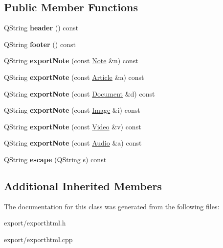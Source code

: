 \subsection*{Public Member Functions}
\begin{DoxyCompactItemize}
\item 
\hypertarget{class_export_h_t_m_l_af378e8ae98f67529f39f46cca79a5fef}{Q\-String {\bfseries header} () const }\label{class_export_h_t_m_l_af378e8ae98f67529f39f46cca79a5fef}

\item 
\hypertarget{class_export_h_t_m_l_a0d43c1eb88206e4619f6a1ebda4898cb}{Q\-String {\bfseries footer} () const }\label{class_export_h_t_m_l_a0d43c1eb88206e4619f6a1ebda4898cb}

\item 
\hypertarget{class_export_h_t_m_l_ad0f6f266f32dd6d3d17832933b7a697e}{Q\-String {\bfseries export\-Note} (const \hyperlink{class_note}{Note} \&n) const }\label{class_export_h_t_m_l_ad0f6f266f32dd6d3d17832933b7a697e}

\item 
\hypertarget{class_export_h_t_m_l_a1b04a2b0efc3b0a5a3e8030382c14f53}{Q\-String {\bfseries export\-Note} (const \hyperlink{class_article}{Article} \&a) const }\label{class_export_h_t_m_l_a1b04a2b0efc3b0a5a3e8030382c14f53}

\item 
\hypertarget{class_export_h_t_m_l_aa2a5cf56206fece15be32609b4908a20}{Q\-String {\bfseries export\-Note} (const \hyperlink{class_document}{Document} \&d) const }\label{class_export_h_t_m_l_aa2a5cf56206fece15be32609b4908a20}

\item 
\hypertarget{class_export_h_t_m_l_a21fa1e9ed061d68f6879023ff370582b}{Q\-String {\bfseries export\-Note} (const \hyperlink{class_image}{Image} \&i) const }\label{class_export_h_t_m_l_a21fa1e9ed061d68f6879023ff370582b}

\item 
\hypertarget{class_export_h_t_m_l_a578b2ca8a2829840eae42978c4691823}{Q\-String {\bfseries export\-Note} (const \hyperlink{class_video}{Video} \&v) const }\label{class_export_h_t_m_l_a578b2ca8a2829840eae42978c4691823}

\item 
\hypertarget{class_export_h_t_m_l_a389010ab7204abeb24cf407dd732abb4}{Q\-String {\bfseries export\-Note} (const \hyperlink{class_audio}{Audio} \&a) const }\label{class_export_h_t_m_l_a389010ab7204abeb24cf407dd732abb4}

\item 
\hypertarget{class_export_h_t_m_l_afdd5b7e17ff352788346e64f2c717adc}{Q\-String {\bfseries escape} (Q\-String s) const }\label{class_export_h_t_m_l_afdd5b7e17ff352788346e64f2c717adc}

\end{DoxyCompactItemize}
\subsection*{Additional Inherited Members}


The documentation for this class was generated from the following files\-:\begin{DoxyCompactItemize}
\item 
export/exporthtml.\-h\item 
export/exporthtml.\-cpp\end{DoxyCompactItemize}
